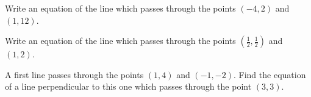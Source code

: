 \begin{exercise}
Write an equation of the line which passes through the points $(-4,2)$ and $(1,12)$.
\end{exercise}
\bigskip

\begin{exercise}
Write an equation of the line which passes through the points $(\frac{1}{2},\frac{1}{2})$ and $(1,2)$.
\end{exercise}
\bigskip

\begin{exercise}
A first line passes through the points $(1,4)$ and $(-1,-2)$.  Find the equation of a line perpendicular to this one which passes through the point $(3,3)$.
\end{exercise}
\bigskip

\begin{exercise}
\end{exercise}
\bigskip

\begin{exercise}
\end{exercise}
\bigskip

\begin{exercise}
\end{exercise}
\bigskip

\begin{exercise}
\end{exercise}
\bigskip

\begin{exercise}
\end{exercise}
\bigskip

\begin{exercise}
\end{exercise}
\bigskip

\begin{exercise}
\end{exercise}
\bigskip

\begin{exercise}
\end{exercise}
\bigskip